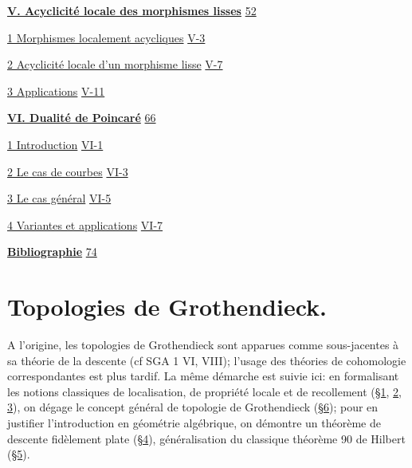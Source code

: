 \hyperref[I:5]{\textbf{V. Acyclicité locale des morphismes lisses}}\dotfill
  \hyperref[I:5]{52}\par
\hspace*{1.5em}\hyperref[I:5-1]{1 Morphismes localement acycliques}\dotfill
  \hyperref[I:5-1]{V-3}\par
\hspace*{1.5em}\hyperref[I:5-2]{2 Acyclicité locale d'un morphisme lisse}\dotfill
  \hyperref[I:5-2]{V-7}\par
\hspace*{1.5em}\hyperref[I:5-3]{3 Applications}\dotfill
  \hyperref[I:5-3]{V-11}\par

\hyperref[I:6]{\textbf{VI. Dualité de Poincaré}}\dotfill
  \hyperref[I:6]{66}\par
\hspace*{1.5em}\hyperref[I:6-1]{1 Introduction}\dotfill
  \hyperref[I:6-1]{VI-1}\par
\hspace*{1.5em}\hyperref[I:6-2]{2 Le cas de courbes}\dotfill
  \hyperref[I:6-2]{VI-3}\par
\hspace*{1.5em}\hyperref[I:6-3]{3 Le cas général}\dotfill
  \hyperref[I:6-3]{VI-5}\par
\hspace*{1.5em}\hyperref[I:6-4]{4 Variantes et applications}\dotfill
  \hyperref[I:6-4]{VI-7}\par

\hyperref[I:bib]{\textbf{Bibliographie}}\dotfill
  \hyperref[I:bib]{74}\par
\endgroup

\newpage

\section{Topologies de Grothendieck.}\label{I:1}

A l'origine, les topologies de Grothendieck sont apparues comme sous-jacentes 
à sa théorie de la descente (cf SGA 1 VI, VIII); l'usage des théories de 
cohomologie correspondantes est plus tardif. La même démarche est suivie 
ici: en formalisant les notions classiques de localisation, de propriété 
locale et de recollement (\hyperref[I:1-1]{\S 1}, \hyperref[I:1-2]{2},
\hyperref[I:1-3]{3}), on dégage le concept général de topologie de Grothendieck
(\hyperref[I:1-6]{\S 6}); pour en justifier 
l'introduction en géométrie algébrique, on démontre un théorème 
de descente fidèlement plate (\hyperref[I:1-4]{\S 4}), généralisation du
classique théorème 90 de Hilbert (\hyperref[I:1-5]{\S 5}). 

